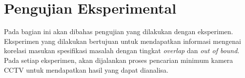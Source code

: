 

\section{Pengujian Eksperimental}
Pada bagian ini akan dibahas pengujian yang dilakukan dengan eksperimen. Eksperimen yang dilakukan bertujuan untuk mendapatkan informasi mengenai korelasi masukan spesifikasi masalah dengan tingkat \textit{overlap} dan \textit{out of bound}. Pada setiap eksperimen, akan dijalankan proses pencarian minimum kamera CCTV untuk mendapatkan hasil yang dapat dianalisa.

